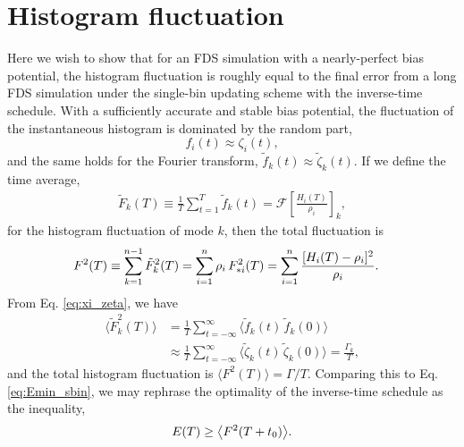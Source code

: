 \documentclass[reprint, superscriptaddress, floatfix]{revtex4-1}
\newcommand{\Err}{E}
\begin{document}
\section{\label{sec:hfluc}
Histogram fluctuation}


Here we wish to show that for an FDS simulation
with a nearly-perfect bias potential,
the histogram fluctuation
is roughly equal to the final error
from a long FDS simulation under the single-bin updating scheme
with the inverse-time schedule.
%
With a sufficiently accurate and stable bias potential,
the fluctuation of
the instantaneous histogram is dominated by the random part,
%
\begin{equation}
  f_i(t) \approx \zeta_i(t)
  ,
  \label{eq:xi_zeta}
\end{equation}
and the same holds for the Fourier transform,
$\tilde f_k(t) \approx \tilde \zeta_k(t).$
%
If we define the time average,
%
\begin{align*}
\tilde F_k(T) \equiv \frac 1 T \sum_{t = 1}^T \tilde f_k(t)
=\mathcal F\left[ \frac{ H_i(T) } { \rho_i } \right]_k
,
\end{align*}
%
for the histogram fluctuation of mode $k$,
then the total fluctuation is
%
\begin{align}
  F^2(T)
  &\equiv
  \sum_{k=1}^{n-1} \tilde F_k^2(T)
  =
  \sum_{i=1}^{n} \rho_i \, F_{*i}^2(T)
  =
  \sum_{i=1}^n
  \frac{ [ H_i(T) -\rho_i]^2 }{\rho_i}
  .
  \notag
\end{align}
%
From Eq. \eqref{eq:xi_zeta}, we have
%
\begin{align*}
\bigl\langle \tilde F_k^2(T) \bigr\rangle
&=
\frac{1}{T}
\sum_{t=-\infty}^\infty
\bigl\langle
  \tilde f_k(t) \, \tilde f_k(0)
\bigr\rangle
\\
&\approx
\frac{1}{T}
\sum_{t=-\infty}^\infty
\bigl\langle
  \tilde \zeta_k(t) \, \tilde \zeta_k(0)
\bigr\rangle
=
\frac{ \Gamma_k } { T }
,
\end{align*}
%
and the total histogram fluctuation is
$\bigl\langle F^2(T) \bigr\rangle = \Gamma/T$.
%
Comparing this to Eq. \eqref{eq:Emin_sbin},
we may rephrase the optimality of the inverse-time schedule
as the inequality,
\begin{equation}
  \Err(T)
  \ge
  \bigl\langle F^2(T+t_0) \bigr\rangle
  .
  \notag
\end{equation}
%
\end{document}
